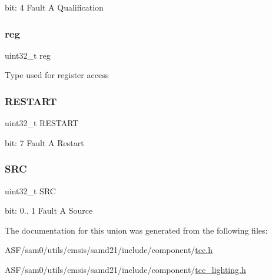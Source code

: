 bit\+: 4 Fault A Qualification \mbox{\label{union_t_c_c___f_c_t_r_l_a___type_a6b91636401516a477989a336376d7b40}} 
\subsubsection{\texorpdfstring{reg}{reg}}
{\footnotesize\ttfamily uint32\+\_\+t reg}

Type used for register access \mbox{\label{union_t_c_c___f_c_t_r_l_a___type_ab492835f5a772d02c85d8ce8370ff02e}} 
\subsubsection{\texorpdfstring{RESTART}{RESTART}}
{\footnotesize\ttfamily uint32\+\_\+t R\+E\+S\+T\+A\+RT}

bit\+: 7 Fault A Restart \mbox{\label{union_t_c_c___f_c_t_r_l_a___type_a306a1d33a25b1f2253b4b855b6e8c0d5}} 
\subsubsection{\texorpdfstring{SRC}{SRC}}
{\footnotesize\ttfamily uint32\+\_\+t S\+RC}

bit\+: 0.. 1 Fault A Source 

The documentation for this union was generated from the following files\+:\begin{DoxyCompactItemize}
\item 
A\+S\+F/sam0/utils/cmsis/samd21/include/component/\mbox{\hyperlink{tcc_8h}{tcc.\+h}}\item 
A\+S\+F/sam0/utils/cmsis/samd21/include/component/\mbox{\hyperlink{tcc__lighting_8h}{tcc\+\_\+lighting.\+h}}\end{DoxyCompactItemize}
